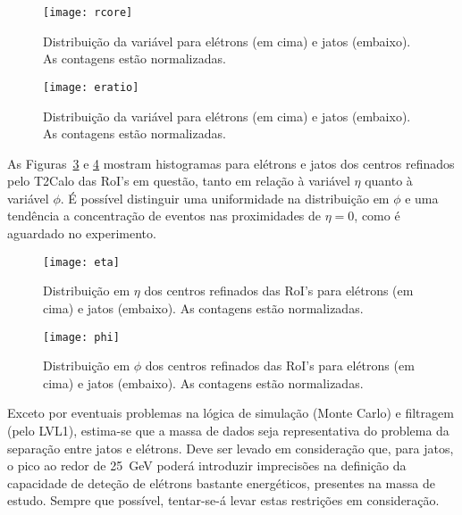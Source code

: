\begin{figure}
\begin{center}
\texttt{[image: rcore]}
\end{center}
\caption{Distribuição da variável \rcore para elétrons (em cima) e jatos
(embaixo). As contagens estão normalizadas.}
\label{fig:rcore}
\end{figure}

\begin{figure}
\begin{center}
\texttt{[image: eratio]}
\end{center}
\caption{Distribuição da variável \eratio para elétrons (em cima) e jatos
(embaixo). As contagens estão normalizadas.}
\label{fig:eratio}
\end{figure}

As Figuras~\ref{fig:eta} e \ref{fig:phi} mostram histogramas para elétrons e
jatos dos centros refinados pelo T2Calo das RoI's em questão, tanto em relação
à variável $\eta$ quanto à variável $\phi$. É possível distinguir uma
uniformidade na distribuição em $\phi$ e uma tendência a concentração de
eventos nas proximidades de $\eta=0$, como é aguardado no experimento.

\begin{figure}
\begin{center}
\texttt{[image: eta]}
\end{center}
\caption{Distribuição em $\eta$ dos centros refinados das RoI's para elétrons
(em cima) e jatos (embaixo). As contagens estão normalizadas.}
\label{fig:eta}
\end{figure}

\begin{figure}
\begin{center}
\texttt{[image: phi]}
\end{center}
\caption{Distribuição em $\phi$ dos centros refinados das RoI's para elétrons
(em cima) e jatos (embaixo). As contagens estão normalizadas.}
\label{fig:phi}
\end{figure}

Exceto por eventuais problemas na lógica de simulação (Monte Carlo) e
filtragem (pelo LVL1), estima-se que a massa de dados seja representativa do
problema da separação entre jatos e elétrons. Deve ser levado em consideração
que, para jatos, o pico ao redor de 25~GeV poderá introduzir imprecisões na
definição da capacidade de deteção de elétrons bastante energéticos, presentes
na massa de estudo. Sempre que possível, tentar-se-á levar estas restrições em
consideração.

